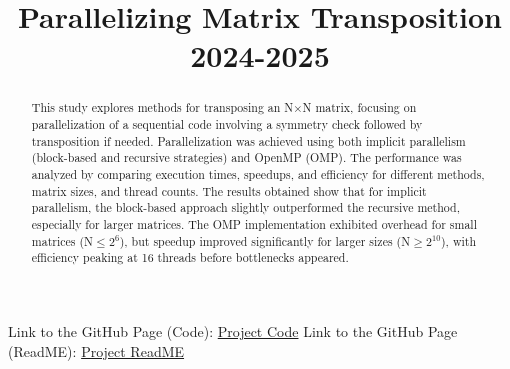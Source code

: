 \documentclass[conference]{IEEEtran}
\begin{document}
\title{Parallelizing Matrix Transposition 2024-2025}

\author{
}
\maketitle
\begin{abstract}
This study explores methods for transposing an N$\times$N matrix, focusing on parallelization of a sequential code involving a symmetry check followed by transposition if needed.
Parallelization was achieved using both implicit parallelism (block-based and recursive strategies) and OpenMP (OMP).
The performance was analyzed by comparing execution times, speedups, and efficiency for different methods, matrix sizes, and thread counts.
The results obtained show that for implicit parallelism, the block-based approach slightly outperformed the recursive method, especially for larger matrices.
The OMP implementation exhibited overhead for small matrices (N$\leq 2^6$), but speedup improved significantly for larger sizes (N$\geq 2^{10}$), with efficiency peaking at 16 threads before bottlenecks appeared.
\end{abstract}

\newpage
\printbibliography
Link to the GitHub Page (Code):
\href{https://github.com/Gotta003/Matteo_Gottardelli_Intro_Parco_H1-2024-2025/tree/main/Matrix_Transposition}{Project Code}
\newline Link to the GitHub Page (ReadME):
\href{https://github.com/Gotta003/Matteo_Gottardelli_Intro_Parco_H1-2024-2025/blob/main/README.md}{Project ReadME}
\if
\fi
\end{document}
